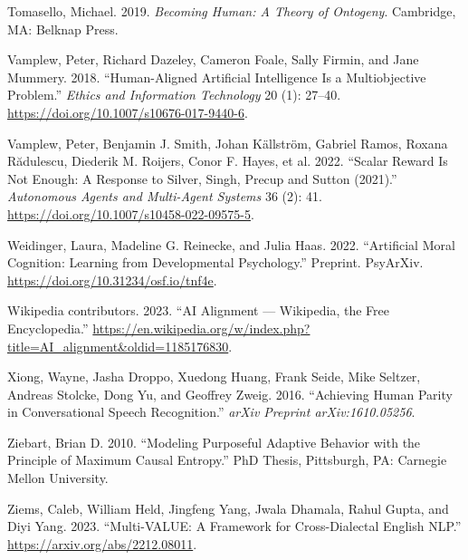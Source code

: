 \documentclass[
  letterpaper,
  DIV=11,
  numbers=noendperiod,
  oneside]{scrreprt}
\newlength{\cslhangindent}
\newenvironment{CSLReferences}[2] %
 {\begin{list}{}{%
  \setlength{\itemindent}{0pt}
  \setlength{\leftmargin}{0pt}
  \setlength{\parsep}{0pt}
  \ifodd #1
   \setlength{\leftmargin}{\cslhangindent}
   \setlength{\itemindent}{-1\cslhangindent}
  \fi
  \setlength{\itemsep}{#2\baselineskip}}}
 {\end{list}}
\theoremstyle{remark}
\begin{document}
\begin{CSLReferences}{1}{0}
Tomasello, Michael. 2019. \emph{Becoming Human: {A} Theory of Ontogeny}.
Cambridge, MA: Belknap Press.

Vamplew, Peter, Richard Dazeley, Cameron Foale, Sally Firmin, and Jane
Mummery. 2018. {``Human-Aligned Artificial Intelligence Is a
Multiobjective Problem.''} \emph{Ethics and Information Technology} 20
(1): 27--40. \url{https://doi.org/10.1007/s10676-017-9440-6}.

Vamplew, Peter, Benjamin J. Smith, Johan Källström, Gabriel Ramos,
Roxana Rădulescu, Diederik M. Roijers, Conor F. Hayes, et al. 2022.
{``Scalar Reward Is Not Enough: A Response to {Silver}, {Singh},
{Precup} and {Sutton} (2021).''} \emph{Autonomous Agents and Multi-Agent
Systems} 36 (2): 41. \url{https://doi.org/10.1007/s10458-022-09575-5}.

Weidinger, Laura, Madeline G. Reinecke, and Julia Haas. 2022.
{``Artificial Moral Cognition: {Learning} from Developmental
Psychology.''} Preprint. PsyArXiv.
\url{https://doi.org/10.31234/osf.io/tnf4e}.

Wikipedia contributors. 2023. {``AI Alignment --- {Wikipedia}{,} the
Free Encyclopedia.''}
\url{https://en.wikipedia.org/w/index.php?title=AI_alignment&oldid=1185176830}.

Xiong, Wayne, Jasha Droppo, Xuedong Huang, Frank Seide, Mike Seltzer,
Andreas Stolcke, Dong Yu, and Geoffrey Zweig. 2016. {``Achieving Human
Parity in Conversational Speech Recognition.''} \emph{arXiv Preprint
arXiv:1610.05256}.

Ziebart, Brian D. 2010. {``Modeling Purposeful Adaptive Behavior with
the Principle of Maximum Causal Entropy.''} PhD Thesis, Pittsburgh, PA:
Carnegie Mellon University.

Ziems, Caleb, William Held, Jingfeng Yang, Jwala Dhamala, Rahul Gupta,
and Diyi Yang. 2023. {``Multi-VALUE: A Framework for Cross-Dialectal
English NLP.''} \url{https://arxiv.org/abs/2212.08011}.

\end{CSLReferences}

\label{sec-ack}
\end{document}
